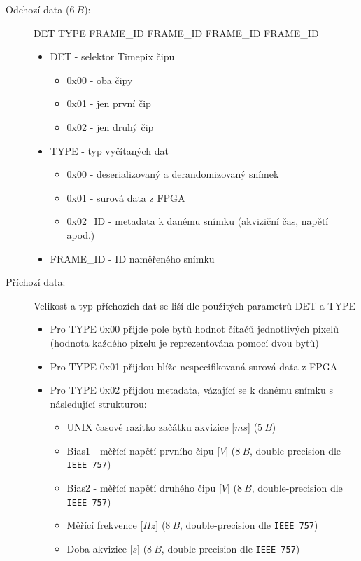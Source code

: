 \begin{description}
		\begin{description}
			\item[Odchozí data ($6~B$):] DET TYPE FRAME\_ID FRAME\_ID FRAME\_ID FRAME\_ID
				\begin{itemize}
					\item DET - selektor Timepix čipu
						\begin{itemize}
							\item 0x00 - oba čipy
							\item 0x01 - jen první čip
							\item 0x02 - jen druhý čip
						\end{itemize}
					\item TYPE - typ vyčítaných dat
						\begin{itemize}
							\item 0x00 - deserializovaný a derandomizovaný snímek
							\item 0x01 - surová data z FPGA
							\item 0x02\_ID - metadata k danému snímku (akviziční čas, napětí apod.)
						\end{itemize}
					\item FRAME\_ID - ID naměřeného snímku
				\end{itemize}
			\item[Příchozí data:] Velikost a typ příchozích dat se liší dle použitých parametrů DET a TYPE
				\begin{itemize}
					\item Pro TYPE 0x00 přijde pole bytů hodnot čítačů jednotlivých pixelů (hodnota každého pixelu je reprezentována pomocí dvou bytů)
					\item Pro TYPE 0x01 přijdou blíže nespecifikovaná surová data z FPGA
					\item Pro TYPE 0x02 přijdou metadata, vázající se k danému snímku s následující strukturou:
						\begin{itemize}
							\item UNIX časové razítko začátku akvizice [$ms$] ($5~B$)
							\item Bias1 - měřící napětí prvního čipu [$V$] ($8~B$, double-precision dle \texttt{IEEE 757})
							\item Bias2 - měřící napětí druhého čipu [$V$] ($8~B$, double-precision dle \texttt{IEEE 757})
							\item Měřící frekvence [$Hz$] ($8~B$, double-precision dle \texttt{IEEE 757})
							\item Doba akvizice [$s$] ($8~B$, double-precision dle \texttt{IEEE 757})
						\end{itemize}	


\end{itemize}
\end{description}
\end{description}
